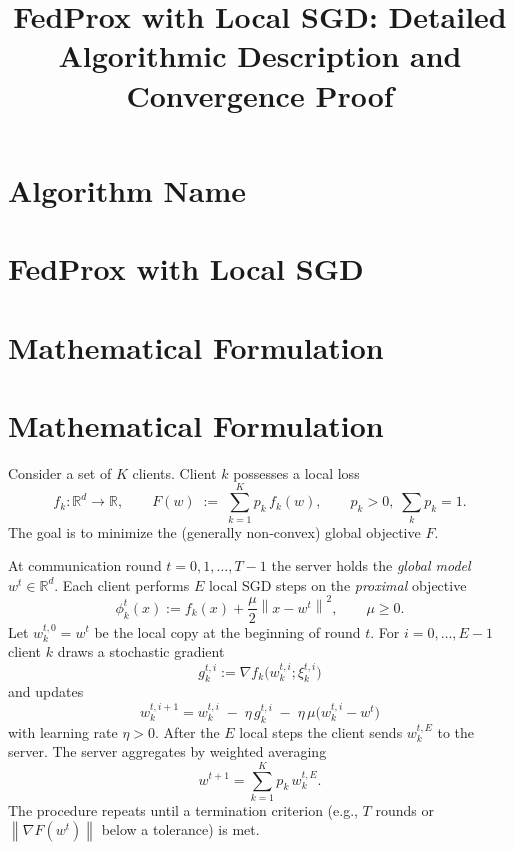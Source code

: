 \documentclass{article}
\newcommand{\norm}[1]{\left\lVert#1\right\rVert}
\newcommand{\R}{\mathbb{R}}
\begin{document}
\title{FedProx with Local SGD: Detailed Algorithmic Description and Convergence Proof}
\author{}
\date{}
\maketitle

\tableofcontents

\newpage

\section*{Algorithm Name}
\section{FedProx with Local SGD}

\section*{Mathematical Formulation}
\section{Mathematical Formulation}
Consider a set of $K$ clients.  Client $k$ possesses a local loss
\[
f_k:\R^{d}\to\R,\qquad 
F(w)\;:=\;\sum_{k=1}^{K}p_k\,f_k(w),\qquad p_k>0,\;\sum_{k}p_k=1 .
\]
The goal is to minimize the (generally non‑convex) global objective $F$.

At communication round $t=0,1,\dots,T-1$ the server holds the \emph{global model}
$w^{t}\in\R^{d}$.  Each client performs $E$ local SGD steps on the
\emph{proximal} objective
\[
\phi_{k}^{t}(x):= f_k(x)+\frac{\mu}{2}\norm{x-w^{t}}^{2},
\qquad \mu\ge 0 .
\]
Let $w_{k}^{t,0}=w^{t}$ be the local copy at the beginning of round $t$.
For $i=0,\dots,E-1$ client $k$ draws a stochastic gradient
\[
g_{k}^{t,i}:= \nabla f_k\bigl(w_{k}^{t,i};\xi_{k}^{t,i}\bigr)
\]
and updates
\begin{equation}
\boxed{
w_{k}^{t,i+1}= w_{k}^{t,i}
        \;-\;\eta\,g_{k}^{t,i}
        \;-\;\eta\,\mu\bigl(w_{k}^{t,i}-w^{t}\bigr)
}
\label{eq:local-update}
\end{equation}
with learning rate $\eta>0$.
After the $E$ local steps the client sends $w_{k}^{t,E}$ to the server.
The server aggregates by weighted averaging
\begin{equation}
\boxed{
w^{t+1}= \sum_{k=1}^{K}p_k\,w_{k}^{t,E}.
}
\label{eq:global-agg}
\end{equation}
The procedure repeats until a termination criterion (e.g., $T$ rounds or
$\norm{\nabla F(w^{t})}$ below a tolerance) is met.
\end{document}
